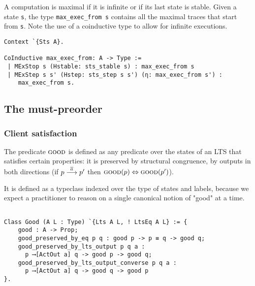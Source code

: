 A computation is maximal if it is infinite or if its last state is stable.
%
Given a state \texttt{s}, the type \lstinline|max_exec_from s| contains all
the maximal traces that start from \texttt{s}. Note the use of a coinductive
type to allow for infinite executions.

\begin{mdframed}
\begin{verbatim}
Context `{Sts A}.

CoInductive max_exec_from: A -> Type :=
 | MExStop s (Hstable: sts_stable s) : max_exec_from s
 | MExStep s s' (Hstep: sts_step s s') (η: max_exec_from s') :
    max_exec_from s.
\end{verbatim}
\end{mdframed}


\subsection{The must-preorder}
\subsubsection{Client satisfaction}

The predicate $\textsc{good}$ is defined as any predicate over the states
of an LTS that satisfies certain properties: it is preserved by
structural congruence, by outputs in both directions
(if $p \mathrel{\overset{\overline{a}}\longrightarrow} p'$ then $\textsc{good}(p) \Leftrightarrow \textsc{good}(p')$).

It is defined as a typeclass indexed over the type of states and
labels, because we expect a practitioner %
to reason on a single canonical notion of "good" at a time.

\begin{mdframed}
\begin{verbatim}

Class Good (A L : Type) `{Lts A L, ! LtsEq A L} := {
    good : A -> Prop;
    good_preserved_by_eq p q : good p -> p ≡ q -> good q;
    good_preserved_by_lts_output p q a :
      p ⟶[ActOut a] q -> good p -> good q;
    good_preserved_by_lts_output_converse p q a :
      p ⟶[ActOut a] q -> good q -> good p
}.

\end{verbatim}
\end{mdframed}

